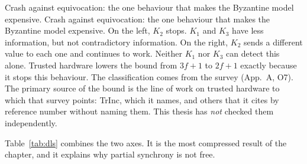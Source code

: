 %
{Crash against equivocation: the one behaviour that makes the Byzantine
model expensive.}%
{Crash against equivocation: the one behaviour that makes the Byzantine
model expensive. On the left, $K_2$ stops. $K_1$ and $K_3$ have less
information, but not contradictory information. On the right, $K_2$
sends a different value to each one and continues to work. Neither $K_1$
nor $K_3$ can detect this alone. Trusted hardware lowers the bound from
$3f{+}1$ to $2f{+}1$ exactly because it stops this behaviour. The
classification comes from the survey \cite{amiri2024bedrock} (App.~A,
O7). The primary source of the bound is the line of work on trusted
hardware to which that survey points: TrInc, which it names, and others
that it cites by reference number without naming them. This thesis has
\emph{not} checked them independently.}%
{}

Table~\ref{tab:dls} combines the two axes. It is the most compressed
result of the chapter, and it explains why partial synchrony is not
free.

